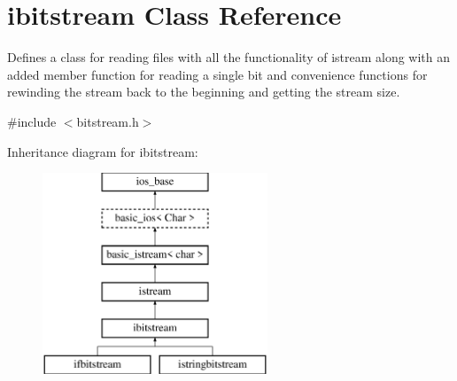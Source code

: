 \hypertarget{classibitstream}{}\section{ibitstream Class Reference}
\label{classibitstream}


Defines a class for reading files with all the functionality of istream along with an added member function for reading a single bit and convenience functions for rewinding the stream back to the beginning and getting the stream size.  




{\ttfamily \#include $<$bitstream.\+h$>$}

Inheritance diagram for ibitstream\+:\begin{figure}[H]
\begin{center}
\leavevmode
\includegraphics[height=6.000000cm]{classibitstream}
\end{center}
\end{figure}
